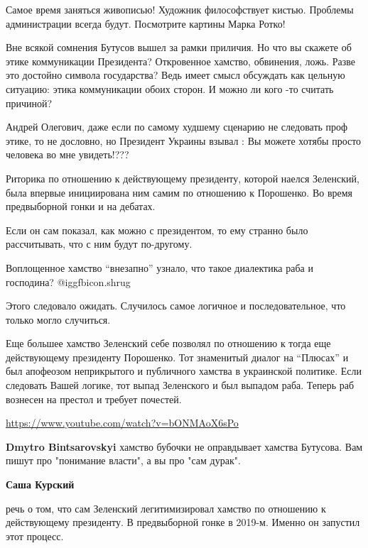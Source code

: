 \begin{itemize}
Самое время заняться живописью! Художник философствует кистью. Проблемы
администрации всегда будут. Посмотрите картины Марка Ротко!


Вне всякой сомнения Бутусов вышел за рамки приличия. Но что вы скажете об этике
коммуникации Президента? Откровенное хамство, обвинения, ложь. Разве это
достойно символа государства? Ведь имеет смысл обсуждать как цельную ситуацию:
этика коммуникации обоих сторон. И можно ли кого -то считать причиной?


Андрей Олегович, даже если по самому худшему сценарию не следовать проф этике,
то не дословно, но Президент Украины взывал : Вы можете хотябы просто человека
во мне увидеть!???


Риторика по отношению к действующему президенту, которой наелся Зеленский, была
впервые инициирована ним самим по отношению к Порошенко. Во время предвыборной
гонки и на дебатах.

Если он сам показал, как можно с президентом, то ему странно было рассчитывать,
что с ним будут по-другому.

Воплощенное хамство \enquote{внезапно} узнало, что такое диалектика раба и господина?
 @igg{fbicon.shrug} 

Этого следовало ожидать. Случилось самое логичное и последовательное, что
только могло случиться.


Еще большее хамство Зеленский себе позволял по отношению к тогда еще
действующему президенту Порошенко. Тот знаменитый диалог на \enquote{Плюсах} и был
апофеозом неприкрытого и публичного хамства в украинской политике. Если
следовать Вашей логике, тот выпад Зеленского и был выпадом раба. Теперь раб
вознесен на престол и требует почестей.

\url{https://www.youtube.com/watch?v=bONMAoX6sPo}

\begin{itemize} %
\textbf{Dmytro Bintsarovskyi} хамство бубочки не оправдывает хамства Бутусова. Вам пишут про "понимание власти", а вы про "сам дурак".

\textbf{Саша Курский} 

речь о том, что сам Зеленский легитимизировал хамство по отношению к
действующему президенту. В предвыборной гонке в 2019-м. Именно он запустил этот
процесс.


\end{itemize}
\end{itemize}
